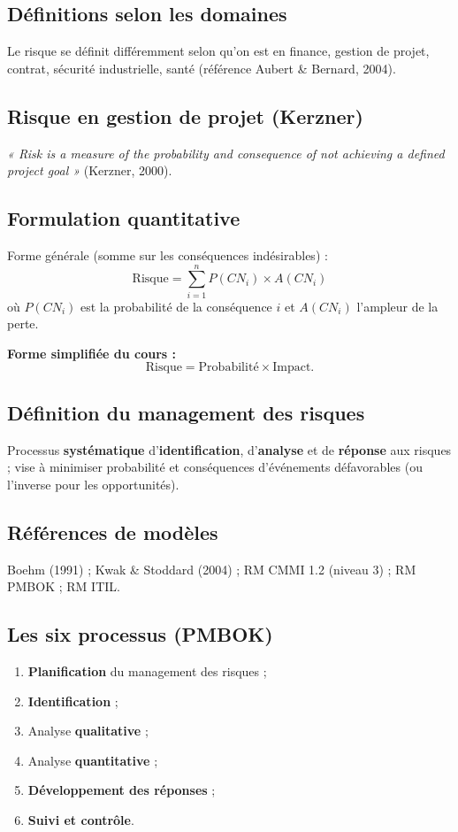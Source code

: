 \documentclass[11pt,a4paper]{article}
\begin{document}
\subsection{Définitions selon les domaines}
Le risque se définit différemment selon qu'on est en finance, gestion de projet, contrat, sécurité industrielle, santé (référence Aubert \& Bernard, 2004).

\subsection{Risque en gestion de projet (Kerzner)}
\textit{« Risk is a measure of the probability and consequence of not achieving a defined project goal »} (Kerzner, 2000).

\subsection{Formulation quantitative}
Forme générale (somme sur les conséquences indésirables) :
\[
\mathrm{Risque} = \sum_{i=1}^{n} P(CN_i) \times A(CN_i)
\]
où $P(CN_i)$ est la probabilité de la conséquence $i$ et $A(CN_i)$ l'ampleur de la perte.

\textbf{Forme simplifiée du cours :}
\[
\mathrm{Risque} = \mathrm{Probabilité} \times \mathrm{Impact}.
\]

\subsection{Définition du management des risques}
Processus \textbf{systématique} d'\textbf{identification}, d'\textbf{analyse} et de \textbf{réponse} aux risques ; vise à minimiser probabilité et conséquences d'événements défavorables (ou l'inverse pour les opportunités).

\subsection{Références de modèles}
Boehm (1991) ; Kwak \& Stoddard (2004) ; RM CMMI 1.2 (niveau 3) ; RM PMBOK ; RM ITIL.

\subsection{Les six processus (PMBOK)}
\begin{enumerate}[nosep]
  \item \textbf{Planification} du management des risques ;
  \item \textbf{Identification} ;
  \item Analyse \textbf{qualitative} ;
  \item Analyse \textbf{quantitative} ;
  \item \textbf{Développement des réponses} ;
  \item \textbf{Suivi et contrôle}.
\end{enumerate}
\end{document}
